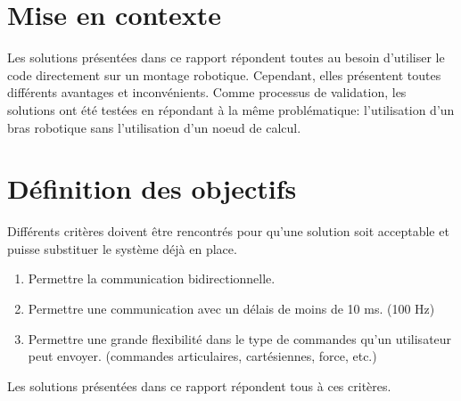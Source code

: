 \documentclass[root.tex]{subfiles}
\begin{document}
\section{Mise en contexte}

Les solutions présentées dans ce rapport répondent toutes au besoin d'utiliser le code directement sur un montage robotique. 
Cependant, elles présentent toutes différents avantages et inconvénients. 
Comme processus de validation, les solutions ont été testées en répondant à la même problématique: l'utilisation d'un bras robotique sans l'utilisation d'un noeud de calcul.


\section{Définition des objectifs}

Différents critères doivent être rencontrés pour qu'une solution soit acceptable et puisse substituer le système déjà en place.

\begin{enumerate}
\item Permettre la communication bidirectionnelle.
\item Permettre une communication avec un délais de moins de 10 ms. (100 Hz)
\item Permettre une grande flexibilité dans le type de commandes qu'un utilisateur peut envoyer. (commandes articulaires, cartésiennes, force, etc.)
\end{enumerate}
Les solutions présentées dans ce rapport répondent tous à ces critères.


\newpage
\end{document}
